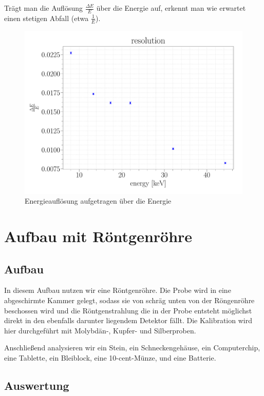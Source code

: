 \documentclass[a4paper,14pt]{article}
\begin{document}
Trägt man die Auflösung $\frac{\Delta E}{E}$ über die Energie auf, erkennt man wie erwartet einen stetigen Abfall (etwa $\frac{1}{E}$).

\begin{figure}[H]
\centering
\includegraphics[scale=0.25]{../Figures/am_resolution.pdf}
\caption{Energieauflösung aufgetragen über die Energie}
\label{am_resolution}
\end{figure}

\section{Aufbau mit Röntgenröhre}
\subsection{Aufbau}
In diesem Aufbau nutzen wir eine Röntgenröhre. Die Probe wird in eine abgeschirmte Kammer gelegt, sodass sie von schräg unten von der Röngenröhre beschossen wird und die Röntgenstrahlung die in der Probe entsteht möglichst direkt in den ebenfalls darunter liegendem Detektor fällt. Die Kalibration wird hier durchgeführt mit Molybdän-, Kupfer- und Silberproben.

Anschließend analysieren wir ein Stein, ein Schneckengehäuse, ein Computerchip, eine Tablette, ein Bleiblock, eine 10-cent-Münze, und eine Batterie.

\subsection{Auswertung}
\end{document}
